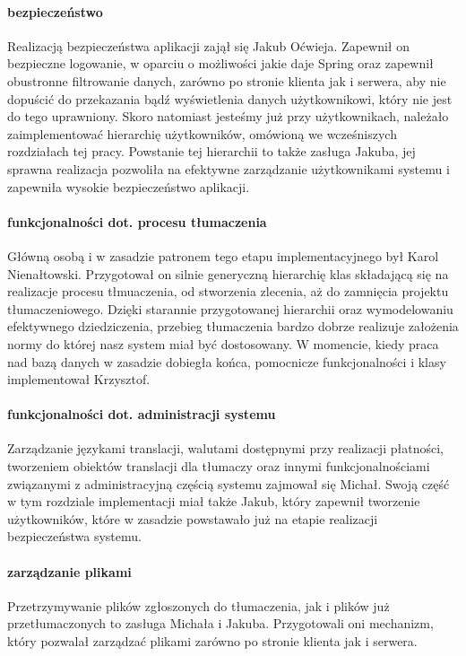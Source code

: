 \documentclass[licencjacka]{pracamgr}
\begin{document}
\paragraph{bezpieczeństwo}
Realizacją bezpieczeństwa aplikacji zajął się Jakub Oćwieja. Zapewnił on bezpieczne logowanie, w oparciu o możliwości jakie daje Spring oraz
zapewnił obustronne filtrowanie danych, zarówno po stronie klienta jak i serwera, aby nie dopuścić do przekazania bądź wyświetlenia danych
użytkownikowi, który nie jest do tego uprawniony. Skoro natomiast jesteśmy już przy użytkownikach, należało zaimplementować hierarchię użytkowników, 
omówioną we wcześniszych rozdziałach tej pracy. Powstanie tej hierarchii to także zasługa Jakuba, 
jej sprawna realizacja pozwoliła na efektywne zarządzanie użytkownikami systemu i zapewniła wysokie bezpieczeństwo aplikacji.

\paragraph{funkcjonalności dot. procesu tłumaczenia}
Główną osobą i w zasadzie patronem tego etapu implementacyjnego był Karol Nienałtowski. Przygotował on silnie generyczną hierarchię klas składającą
się na realizacje procesu tłmuaczenia, od stworzenia zlecenia, aż do zamnięcia projektu tłumaczeniowego. Dzięki starannie przygotowanej hierarchii
oraz wymodelowaniu efektywnego dziedziczenia, przebieg tłumaczenia bardzo dobrze realizuje założenia normy do której nasz system miał być dostosowany.
W momencie, kiedy praca nad bazą danych w zasadzie dobiegła końca, pomocnicze funkcjonalności i klasy implementował Krzysztof.

\paragraph{funkcjonalności dot. administracji systemu}
Zarządzanie językami translacji, walutami dostępnymi przy realizacji płatności, tworzeniem obiektów translacji dla tłumaczy oraz innymi funkcjonalnościami
związanymi z administracyjną częścią systemu zajmował się Michał. Swoją część w tym rozdziale implementacji miał także Jakub, który zapewnił tworzenie użytkowników,
które w zasadzie powstawało już na etapie realizacji bezpieczeństwa systemu.

\paragraph{zarządzanie plikami}
Przetrzymywanie plików zgłoszonych do tłumaczenia, jak i plików już przetłumaczonych to zasługa Michała i Jakuba. Przygotowali oni mechanizm, który pozwalał
zarządzać plikami zarówno po stronie klienta jak i serwera.
\end{document}
